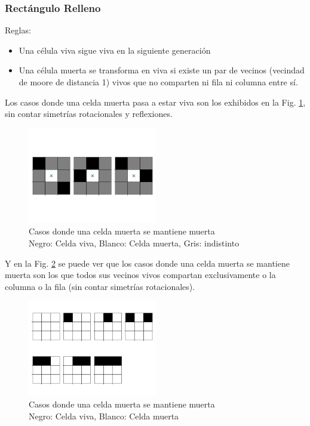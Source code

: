 \subsubsection{Rectángulo Relleno}
Reglas:
\begin{itemize}
    \item Una célula viva sigue viva en la siguiente generación
    \item Una célula muerta se transforma en viva si existe un par de vecinos (vecindad de moore de distancia 1) vivos que no comparten ni fila ni columna entre sí.
\end{itemize}
Los casos donde una celda muerta pasa a estar viva son los exhibidos en la Fig. \ref{fig:filllive}, sin contar simetrías rotacionales y reflexiones.
\begin{figure}[H]
    \centering
    \includegraphics[width=0.5\textwidth]{Images/fill_example_1b}
    \captionsetup{justification=centering}
    \caption{Casos donde una celda muerta se mantiene muerta \\ Negro: Celda viva, Blanco: Celda muerta, Gris: indistinto}
    \label{fig:filllive}
\end{figure}

Y en la Fig. \ref{fig:filldead} se puede ver que los casos donde una celda muerta se mantiene muerta son los que todos sus vecinos vivos compartan exclusivamente o la columna o la fila (sin contar simetrías rotacionales).
\begin{figure}[H]
    \centering
    \includegraphics[width=0.5\textwidth]{Images/fill_example_1a}
    \captionsetup{justification=centering}
    \caption{Casos donde una celda muerta se mantiene muerta\\ Negro: Celda viva, Blanco: Celda muerta}
    \label{fig:filldead}
\end{figure}

